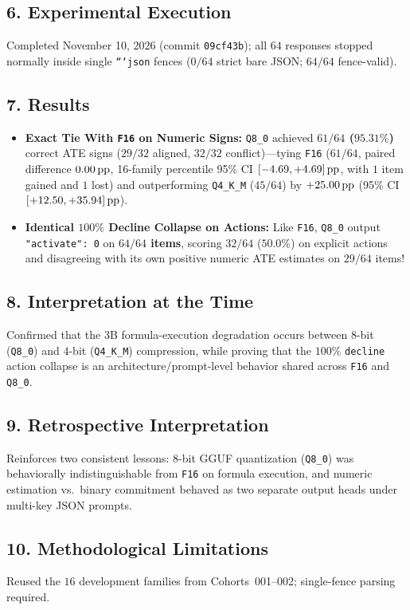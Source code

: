 \subsection*{6. Experimental Execution}
Completed November 10, 2026 (commit \texttt{09cf43b}); all $64$ responses stopped normally inside single \texttt{```json} fences ($0/64$ strict bare JSON; $64/64$ fence-valid).

\subsection*{7. Results}
\begin{itemize}
  \item \textbf{Exact Tie With \texttt{F16} on Numeric Signs:} \texttt{Q8\_0} achieved \textbf{$61/64$ ($95.31\%$)} correct ATE signs ($29/32$ aligned, $32/32$ conflict)---tying \texttt{F16} ($61/64$, paired difference $0.00\,\mathrm{pp}$, 16-family percentile 95\% CI $[-4.69, +4.69]\,\mathrm{pp}$, with $1$ item gained and $1$ lost) and outperforming \texttt{Q4\_K\_M} ($45/64$) by \textbf{$+25.00\,\mathrm{pp}$} (95\% CI $[+12.50, +35.94]\,\mathrm{pp}$).
  \item \textbf{Identical $100\%$ Decline Collapse on Actions:} Like \texttt{F16}, \texttt{Q8\_0} output \texttt{"activate": 0} on \textbf{$64/64$ items}, scoring $32/64$ ($50.0\%$) on explicit actions and disagreeing with its own positive numeric ATE estimates on $29/64$ items!
\end{itemize}

\subsection*{8. Interpretation at the Time}
Confirmed that the 3B formula-execution degradation occurs between $8$-bit (\texttt{Q8\_0}) and $4$-bit (\texttt{Q4\_K\_M}) compression, while proving that the $100\%$ \texttt{decline} action collapse is an architecture/prompt-level behavior shared across \texttt{F16} and \texttt{Q8\_0}.

\subsection*{9. Retrospective Interpretation}
Reinforces two consistent lessons: 8-bit GGUF quantization (\texttt{Q8\_0}) was behaviorally indistinguishable from \texttt{F16} on formula execution, and numeric estimation vs.\ binary commitment behaved as two separate output heads under multi-key JSON prompts.

\subsection*{10. Methodological Limitations}
Reused the $16$ development families from Cohorts~001--002; single-fence parsing required.

